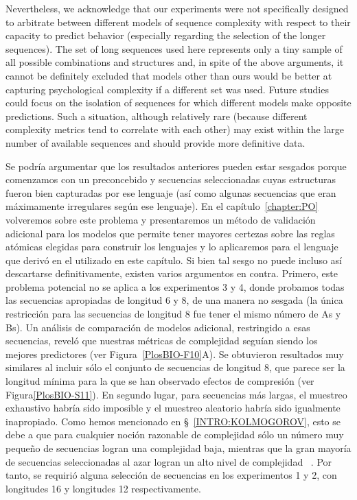 Nevertheless, we acknowledge that our experiments were not specifically designed to arbitrate between different models of sequence complexity with respect to their capacity to predict behavior (especially regarding the selection of the longer sequences). The set of long sequences used here represents only a tiny sample of all possible combinations and structures and, in spite of the above arguments, it cannot be definitely excluded that models other than ours would be better at capturing psychological complexity if a different set was used. Future studies could focus on the isolation of sequences for which different models make opposite predictions. Such a situation, although relatively rare (because different complexity metrics tend to correlate with each other) may exist within the large number of available sequences and should provide more definitive data.

Se podría argumentar que los resultados anteriores pueden estar sesgados porque comenzamos con un \lot preconcebido y secuencias seleccionadas cuyas estructuras fueron bien capturadas por ese lenguaje (así como algunas secuencias que eran máximamente irregulares según ese lenguaje). En el capítulo~\ref{chapter:PO} volveremos sobre este problema y presentaremos un método de validación adicional para los modelos \lot que permite tener mayores certezas sobre las reglas atómicas elegidas para construir los lenguajes y lo aplicaremos para el lenguaje \gramgeo que derivó en el utilizado en este capítulo. Si bien tal sesgo no puede incluso así descartarse definitivamente, existen varios argumentos en contra. Primero, este problema potencial no se aplica a los experimentos 3 y 4, donde probamos todas las secuencias apropiadas de longitud 6 y 8, de una manera no sesgada (la única restricción para las secuencias de longitud 8 fue tener el mismo número de As y Bs). Un análisis de comparación de modelos adicional, restringido a esas secuencias, reveló que nuestras métricas de complejidad seguían siendo los mejores predictores (ver Figura~\ref{PlosBIO-F10}A). Se obtuvieron resultados muy similares al incluir sólo el conjunto de secuencias de longitud 8, que parece ser la longitud mínima para la que se han observado efectos de compresión (ver Figura\ref{PlosBIO-S11}). En segundo lugar, para secuencias más largas, el muestreo exhaustivo habría sido imposible y el muestreo aleatorio habría sido igualmente inapropiado. Como hemos mencionado en \S~\ref{INTRO:KOLMOGOROV}, esto se debe a que para cualquier noción razonable de complejidad sólo un número muy pequeño de secuencias logran una complejidad baja, mientras que la gran mayoría de secuencias seleccionadas al azar logran un alto nivel de complejidad ~\cite{chaitin1975theory,C87b}. Por tanto, se requirió alguna selección de secuencias en los experimentos 1 y 2, con longitudes 16 y longitudes 12 respectivamente. 


